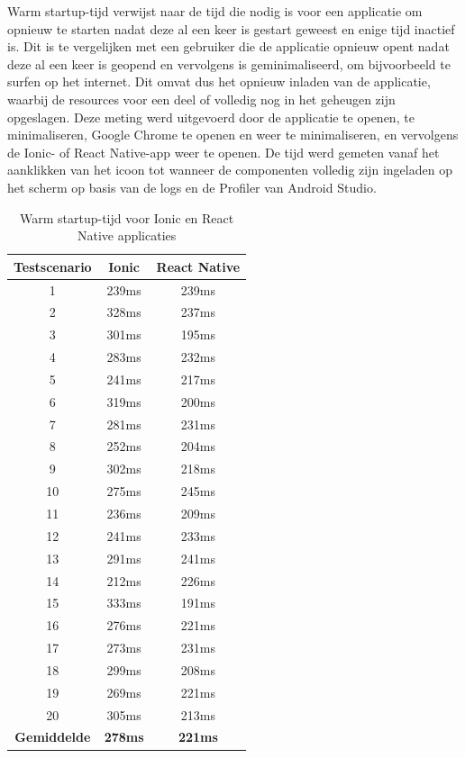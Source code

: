 Warm startup-tijd verwijst naar de tijd die nodig is voor een applicatie om opnieuw te starten nadat deze al een keer is gestart geweest en enige tijd inactief is. Dit is te vergelijken met een gebruiker die de applicatie opnieuw opent nadat deze al een keer is geopend en vervolgens is geminimaliseerd, om bijvoorbeeld te surfen op het internet. Dit omvat dus het opnieuw inladen van de applicatie, waarbij de resources voor een deel of volledig nog in het geheugen zijn opgeslagen. Deze meting werd uitgevoerd door de applicatie te openen, te minimaliseren, Google Chrome te openen en weer te minimaliseren, en vervolgens de Ionic- of React Native-app weer te openen. De tijd werd gemeten vanaf het aanklikken van het icoon tot wanneer de componenten volledig zijn ingeladen op het scherm op basis van de logs en de Profiler van Android Studio.

\begin{table}[htbp]
  \centering
  \begin{tabular}{|c|c|c|}
  \hline
  \textbf{Testscenario} & \textbf{Ionic} & \textbf{React Native} \\
  \hline
  1 & 239ms & 239ms \\
  \hline
  2 & 328ms & 237ms \\
  \hline
  3 & 301ms & 195ms \\
  \hline
  4 & 283ms & 232ms \\
  \hline
  5 & 241ms & 217ms \\
  \hline
  6 & 319ms & 200ms \\
  \hline
  7 & 281ms & 231ms \\
  \hline
  8 & 252ms & 204ms \\
  \hline
  9 & 302ms & 218ms \\
  \hline
  10 & 275ms & 245ms \\
  \hline
  11 & 236ms & 209ms \\
  \hline
  12 & 241ms & 233ms \\
  \hline
  13 & 291ms & 241ms \\
  \hline
  14 & 212ms & 226ms \\
  \hline
  15 & 333ms & 191ms \\
  \hline
  16 & 276ms & 221ms \\
  \hline
  17 & 273ms & 231ms \\
  \hline
  18 & 299ms & 208ms \\
  \hline
  19 & 269ms & 221ms \\
  \hline
  20 & 305ms & 213ms \\
  \hline
  \textbf{Gemiddelde} & \textbf{278ms} & \textbf{221ms} \\
  \hline
  \end{tabular}
  \caption{Warm startup-tijd voor Ionic en React Native applicaties}
  \label{tab:warm_startup}
\end{table}

